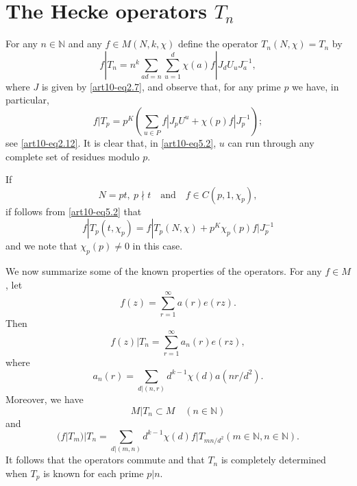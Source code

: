 \section{The Hecke operators \texorpdfstring{$T_{n}$}{Tn}}\label{art10-sec5}
For any $n\in \mathbb{N}$ and any $f\in M(N,k,\chi)$ define the operator $T_{n}(N,\chi)=T_{n}$ by
\setcounter{equation}{0}
\begin{equation}
f|T_{n}=n^{k}\sum\limits_{ad=n}\sum\limits^{d}_{u=1}\chi(a)f|J_{d}U_{u}J^{-1}_{a},\label{art10-eq5.1}
\end{equation}
where $J$ is given by \eqref{art10-eq2.7}, and observe that, for any prime $p$ we have, in particular,
\begin{equation}
f|T_{p}=p^{K}\left(\sum\limits_{u\in P}f|J_{p}U^{u}+\chi(p)f|J^{-1}_{p}\right);\label{art10-eq5.2}
\end{equation}
see \eqref{art10-eq2.12}. It is clear that, in \eqref{art10-eq5.2}, $u$ can run through any complete set of residues modulo $p$.

If
\begin{equation}
N=pt, \ p\nmid t\text{~~ and~~ } f\in C(p,1,\chi_{p}),\label{art10-eq5.3}
\end{equation}
if follows from \eqref{art10-eq5.2} that
\begin{equation}
f|T_{p}(t,\chi_{p})=f|T_{p}(N,\chi)+p^{K}\chi_{p}(p)f|J^{-1}_{p}\label{art10-eq5.4}
\end{equation}
and we note that $\chi_{p}(p)\neq 0$ in this case.

We now summarize some of the known properties of the operators. For any $f\in M$, let 
\begin{equation}
f(z)=\sum\limits^{\infty}_{r=1}a(r)e(rz).\label{art10-eq5.5}
\end{equation}
Then\pageoriginale
\begin{equation}
f(z)|T_{n}=\sum\limits^{\infty}_{r=1}a_{n}(r)e(rz),\label{art10-eq5.6}
\end{equation}
where 
\begin{equation}
a_{n}(r)=\sum\limits_{d|(n,r)}d^{k-1}\chi(d)a(nr/d^{2}).\label{art10-eq5.7}
\end{equation}
Moreover, we have
\begin{equation}
M|T_{n}\subset M\quad (n\in \mathbb{N})\label{art10-eq5.8}
\end{equation}
and
\begin{equation}
(f|T_{m})|T_{n}=\sum\limits_{d|(m,n)}d^{k-1}\chi(d)f|T_{mn/d^{2}}(m\in \mathbb{N},n\in \mathbb{N}).\label{art10-eq5.9}
\end{equation}
It follows that the operators commute and that $T_{n}$ is completely determined when $T_{p}$ is known for each prime $p|n$.

